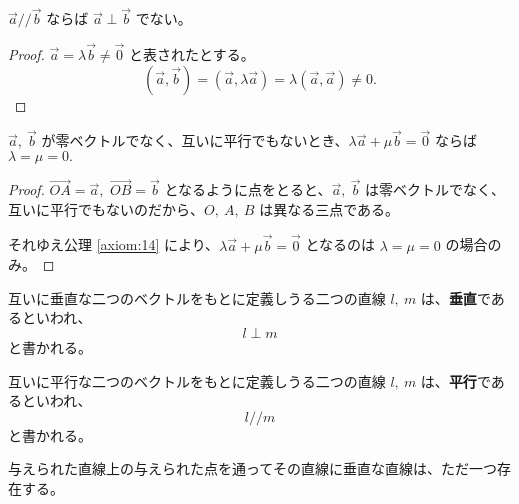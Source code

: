 \begin{thm}\label{theorem:25}
  \(\vec{a}/\!/\vec{b}\) ならば \(\vec{a}\perp\vec{b}\) でない。
\end{thm}

\begin{proof}
  \(\vec{a}=\lambda\vec{b}\neq\vec{0}\) と表されたとする。
  \[(\vec{a},\vec{b})=(\vec{a},\lambda\vec{a})=\lambda(\vec{a},\vec{a})\neq0.\]
\end{proof}

\begin{thm}\label{theorem:26}
 \(\vec{a},\ \vec{b}\) が零ベクトルでなく、互いに平行でもないとき、\(\lambda\vec{a}+\mu\vec{b}=\vec{0}\) ならば \(\lambda=\mu=0.\)
\end{thm}

\begin{proof}
  \(\overrightarrow{OA}=\vec{a},\) \(\overrightarrow{OB}=\vec{b}\) となるように点をとると、\(\vec{a},\ \vec{b}\) は零ベクトルでなく、互いに平行でもないのだから、\(O,\ A,\ B\) は異なる三点である。

  それゆえ公理 \ref{axiom:14} により、\(\lambda\vec{a}+\mu\vec{b}=\vec{0}\) となるのは \(\lambda=\mu=0\) の場合のみ。
\end{proof}

\begin{dfn}[直線の垂直]\label{definition:24}
  互いに垂直な二つのベクトルをもとに定義しうる二つの直線 \(l,\ m\) は、\textbf{垂直}であるといわれ、
  \[l\perp m\]
  と書かれる。
\end{dfn}

\begin{dfn}[直線の平行]\label{definition:25}
  互いに平行な二つのベクトルをもとに定義しうる二つの直線 \(l,\ m\) は、\textbf{平行}であるといわれ、
  \[l/\!/m\]
  と書かれる。
\end{dfn}

\begin{thm}\label{theorem:27}
  与えられた直線上の与えられた点を通ってその直線に垂直な直線は、ただ一つ存在する。
\end{thm}

